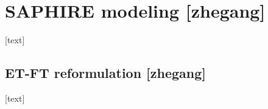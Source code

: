\section{SAPHIRE modeling [zhegang]}
\label{sec:SAPHIREmodeling}

[text]

\subsection{ET-FT reformulation [zhegang]}

[text]